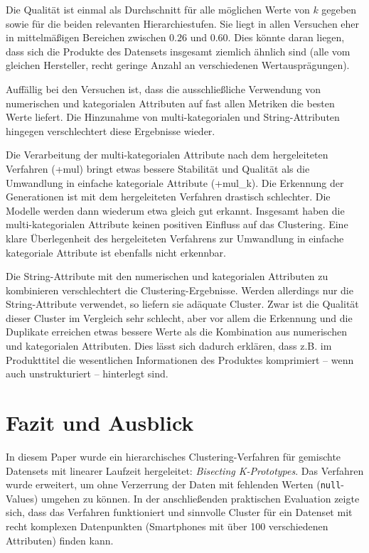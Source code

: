 Die Qualität ist einmal als Durchschnitt für alle möglichen Werte von
\(k\) gegeben sowie für die beiden relevanten Hierarchiestufen. Sie
liegt in allen Versuchen eher in mittelmäßigen Bereichen zwischen
\(0.26\) und \(0.60\). Dies könnte daran liegen, dass sich die Produkte
des Datensets insgesamt ziemlich ähnlich sind (alle vom gleichen
Hersteller, recht geringe Anzahl an verschiedenen Wertausprägungen).

Auffällig bei den Versuchen ist, dass die ausschließliche Verwendung von
numerischen und kategorialen Attributen auf fast allen Metriken die
besten Werte liefert. Die Hinzunahme von multi-kategorialen und
String-Attributen hingegen verschlechtert diese Ergebnisse wieder.

Die Verarbeitung der multi-kategorialen Attribute nach dem hergeleiteten
Verfahren (+mul) bringt etwas bessere Stabilität und Qualität als die
Umwandlung in einfache kategoriale Attribute (+mul\_k). Die Erkennung
der Generationen ist mit dem hergeleiteten Verfahren drastisch
schlechter. Die Modelle werden dann wiederum etwa gleich gut erkannt.
Insgesamt haben die multi-kategorialen Attribute keinen positiven
Einfluss auf das Clustering. Eine klare Überlegenheit des hergeleiteten
Verfahrens zur Umwandlung in einfache kategoriale Attribute ist
ebenfalls nicht erkennbar.

Die String-Attribute mit den numerischen und kategorialen Attributen zu
kombinieren verschlechtert die Clustering-Ergebnisse. Werden allerdings
nur die String-Attribute verwendet, so liefern sie adäquate Cluster.
Zwar ist die Qualität dieser Cluster im Vergleich sehr schlecht, aber
vor allem die Erkennung und die Duplikate erreichen etwas bessere Werte
als die Kombination aus numerischen und kategorialen Attributen. Dies
lässt sich dadurch erklären, dass z.B. im Produkttitel die wesentlichen
Informationen des Produktes komprimiert -- wenn auch unstrukturiert --
hinterlegt sind.

\hypertarget{fazit-und-ausblick}{%
\section{Fazit und Ausblick}\label{fazit-und-ausblick}}

In diesem Paper wurde ein hierarchisches Clustering-Verfahren für
gemischte Datensets mit linearer Laufzeit hergeleitet: \emph{Bisecting
K-Prototypes}. Das Verfahren wurde erweitert, um ohne Verzerrung der
Daten mit fehlenden Werten (\texttt{null}-Values) umgehen zu können. In
der anschließenden praktischen Evaluation zeigte sich, dass das
Verfahren funktioniert und sinnvolle Cluster für ein Datenset mit recht
komplexen Datenpunkten (Smartphones mit über 100 verschiedenen
Attributen) finden kann.

